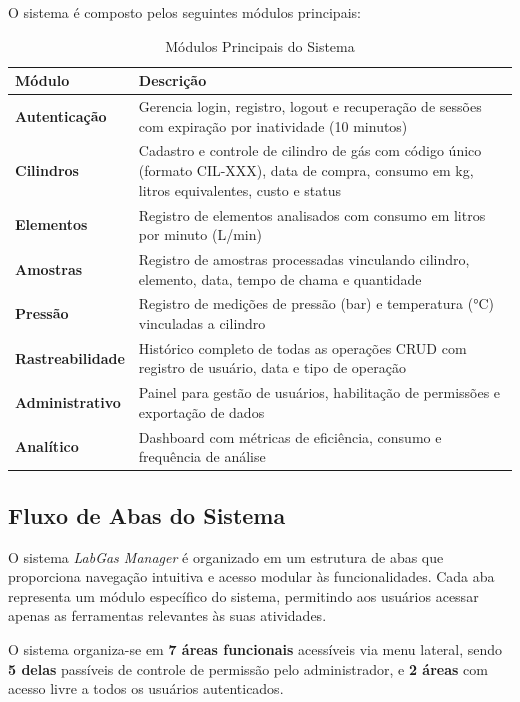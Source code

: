 \documentclass[12pt,a4paper]{article}
\providecommand\关键字[1]{\textbf{#1}}
\begin{document}
O sistema é composto pelos seguintes módulos principais:

\begin{table}[h!]
\centering
\caption{Módulos Principais do Sistema}
\label{tab:modulos}
\begin{tabular}{@{}ll@{}}
\toprule
\textbf{Módulo} & \textbf{Descrição} \\
\midrule
\textbf{Autenticação} & Gerencia login, registro, logout e recuperação de sessões com expiração por inatividade (10 minutos) \\
\textbf{Cilindros} & Cadastro e controle de cilindro de gás com código único (formato CIL-XXX), data de compra, consumo em kg, litros equivalentes, custo e status \\
\textbf{Elementos} & Registro de elementos analisados com consumo em litros por minuto (L/min) \\
\textbf{Amostras} & Registro de amostras processadas vinculando cilindro, elemento, data, tempo de chama e quantidade \\
\textbf{Pressão} & Registro de medições de pressão (bar) e temperatura (°C) vinculadas a cilindro \\
\textbf{Rastreabilidade} & Histórico completo de todas as operações CRUD com registro de usuário, data e tipo de operação \\
\textbf{Administrativo} & Painel para gestão de usuários, habilitação de permissões e exportação de dados \\
\textbf{Analítico} & Dashboard com métricas de eficiência, consumo e frequência de análise \\
\bottomrule
\end{tabular}
\end{table}

\subsection{Fluxo de Abas do Sistema}

O sistema \textit{LabGas Manager} é organizado em um estrutura de abas que proporciona navegação intuitiva e acesso modular às funcionalidades. Cada aba representa um módulo específico do sistema, permitindo aos usuários acessar apenas as ferramentas relevantes às suas atividades.

O sistema organiza-se em \textbf{7 áreas funcionais} acessíveis via menu lateral, sendo \textbf{5 delas} passíveis de controle de permissão pelo administrador, e \textbf{2 áreas} com acesso livre a todos os usuários autenticados.
\end{document}
